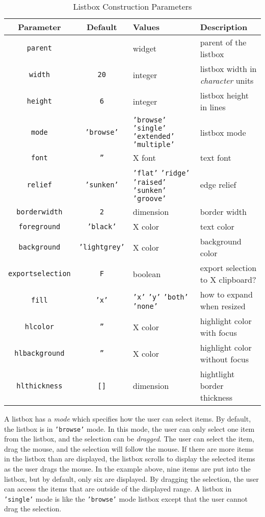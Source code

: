\begin{table}[tbh]
{\small
\begin{center}
\begin{tabular}{|c|c|p{1.6in}|p{1.9in}|}
\hline
Parameter & Default & Values & Description \\
\hline
\hline
{\tt parent}            &               & widget & parent of the listbox \\ \hline
{\tt width}             & {\tt 20}      & integer& listbox width in {\em character} units \\ \hline
{\tt height}            & {\tt 6}       & integer& listbox height in lines \\ \hline
{\tt mode}              & {\tt 'browse'}& {\tt 'browse'} {\tt 'single'} {\tt 'extended'} {\tt 'multiple'} & listbox mode \\ \hline
{\tt font}		& {\tt ''}	& X font & text font \\ \hline
{\tt relief}		& {\tt 'sunken'} & {\tt 'flat'} {\tt 'ridge'} {\tt 'raised'} {\tt 'sunken'} {\tt 'groove'} & edge relief \\ \hline
{\tt borderwidth}       & {\tt 2}       & dimension & border width \\ \hline
{\tt foreground}        & {\tt 'black'} & X color & text color \\ \hline
{\tt background}	& {\tt 'lightgrey'}& X color & background color \\ \hline
{\tt exportselection}	& {\tt F}	& boolean & export selection to X clipboard? \\ \hline
{\tt fill}		& {\tt 'x'}	& {\tt 'x'} {\tt 'y'} {\tt 'both'} {\tt 'none'} & how to expand when resized \\ \hline
{\tt hlcolor}		& {\tt ''}	& X color & highlight color with focus \\ \hline
{\tt hlbackground}	& {\tt ''}	& X color & highlight color without focus \\ \hline
{\tt hlthickness}	& {\tt []}	& dimension & hightlight border thickness \\ \hline
\end{tabular}
\end{center}
}
\caption{ Listbox Construction Parameters }
\label{tklistbox-params}
\end{table}

A listbox has a {\em mode} which specifies how the user can select items. By default,
the listbox is in {\tt 'browse'} mode. In this mode, the user can only select one item
from the listbox, and the selection can be {\em dragged}. The user can select the item,
drag the mouse, and the selection will follow the mouse. If there are more items in
the listbox than are displayed, the listbox scrolls to display the selected items
as the user drags the mouse. In the example above, nine items are put into the listbox,
but by default, only six are displayed. By dragging the selection, the user can access
the items that are outside of the displayed range. A listbox in {\tt 'single'} mode
is like the {\tt 'browse'} mode listbox except that the user cannot  drag the
selection.

